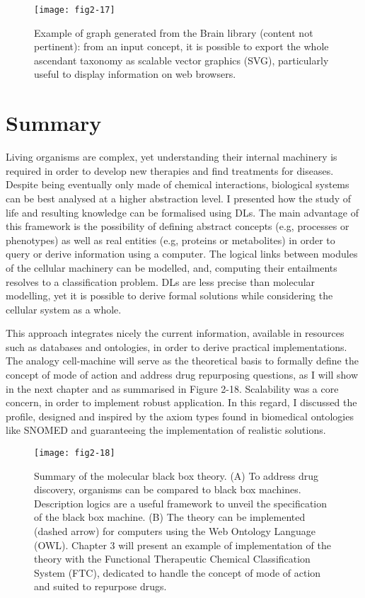 \begin{figure}[ht]
    \centering
    \texttt{[image: fig2-17]}
    \caption{Example of graph generated from the Brain library (content not pertinent): from an input concept, it is possible to export the whole ascendant taxonomy as scalable vector graphics (SVG), particularly useful to display information on web browsers.}
    \label{fig2-17}
\end{figure}

\section{Summary}

Living organisms are complex, yet understanding their internal machinery is required in order to develop new therapies and find treatments for diseases. Despite being eventually only made of chemical interactions, biological systems can be best analysed at a higher abstraction level. I presented how the study of life and resulting knowledge can be formalised using DLs. The main advantage of this framework is the possibility of defining abstract concepts (e.g, processes or phenotypes) as well as real entities (e.g, proteins or metabolites) in order to query or derive information using a computer. The logical links between modules of the cellular machinery can be modelled, and, computing their entailments resolves to a classification problem. DLs are less precise than molecular modelling, yet it is possible to derive formal solutions while considering the cellular system as a whole.

This approach integrates nicely the current information, available in resources such as databases and ontologies, in order to derive practical implementations. The analogy cell-machine will serve as the theoretical basis to formally define the concept of mode of action and address drug repurposing questions, as I will show in the next chapter and as summarised in Figure 2-18. Scalability was a core concern, in order to implement robust application. In this regard, I discussed the  profile, designed and inspired by the axiom types found in biomedical ontologies like SNOMED and guaranteeing the implementation of realistic solutions.

\begin{figure}[ht]
    \centering
    \texttt{[image: fig2-18]}
    \caption{Summary of the molecular black box theory. (A) To address drug discovery, organisms can be compared to black box machines. Description logics are a useful framework to unveil the specification of the black box machine. (B) The theory can be implemented (dashed arrow) for computers using the Web Ontology Language (OWL). Chapter 3 will present an example of implementation of the theory with the Functional Therapeutic Chemical Classification System (FTC), dedicated to handle the concept of mode of action and suited to repurpose drugs.}
    \label{fig2-18}
\end{figure}
